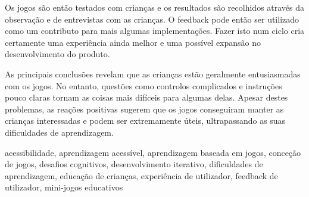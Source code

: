 Os jogos são então testados com crianças e os resultados são recolhidos através da observação e de entrevistas com as crianças. O feedback pode então ser utilizado como um contributo para mais algumas implementações. Fazer isto num ciclo cria certamente uma experiência ainda melhor e uma possível expansão no desenvolvimento do produto.

As principais conclusões revelam que as crianças estão geralmente entusiasmadas com os jogos. No entanto, questões como controlos complicados e instruções pouco claras tornam as coisas mais difíceis para algumas delas. Apesar destes problemas, as reações positivas sugerem que os jogos conseguiram manter as crianças interessadas e podem ser extremamente úteis, ultrapassando as suas dificuldades de aprendizagem.

\begin{keywords}
	acessibilidade, aprendizagem acessível, aprendizagem baseada em jogos, conceção de jogos, desafios cognitivos, desenvolvimento iterativo, dificuldades de aprendizagem, educação de crianças, experiência de utilizador, feedback de utilizador, mini-jogos educativos
\end{keywords}
	
